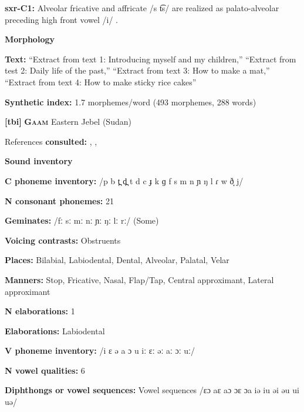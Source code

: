 \textbf{sxr-C1:} Alveolar fricative and affricate /s t͡s/ are realized as palato-alveolar preceding high front vowel /i/ \citep[28]{Pan2012}.



\textbf{Morphology}



\textbf{Text:} “Extract from text 1: Introducing myself and my children,” “Extract from test 2: Daily life of the past,” “Extract from text 3: How to make a mat,” “Extract from text 4: How to make sticky rice cakes” \citep[365-372]{Pan2012}



\textbf{Synthetic index:} 1.7 morphemes/word (493 morphemes, 288 words)



\textbf{[tbi]}   \textbf{\textsc{Gaam}}  Eastern Jebel (Sudan)



References \textbf{consulted:} \citet{Bender1983}, \citet{Crewe1975}, \citet{Stirtz2011}



\textbf{Sound inventory}



\textbf{C phoneme inventory:} /p b t̪ d̪ t d c ɟ k ɡ f s m n ɲ ŋ l ɾ w ð̞ j/



\textbf{N consonant phonemes:} 21



\textbf{Geminates:} /fː sː mː nː ɲː ŋː lː rː/ (Some)



\textbf{Voicing contrasts:} Obstruents



\textbf{Places:} Bilabial, Labiodental, Dental, Alveolar, Palatal, Velar



\textbf{Manners:} Stop, Fricative, Nasal, Flap/Tap, Central approximant, Lateral approximant



\textbf{N elaborations:} 1



\textbf{Elaborations:} Labiodental



\textbf{V phoneme inventory:} /i ɛ ə a ɔ u iː ɛː əː aː ɔː uː/



\textbf{N vowel qualities:} 6



\textbf{Diphthongs or vowel sequences:} Vowel sequences /ɛɔ aɛ aɔ ɔɛ ɔa iə iu əi əu ui uə/



